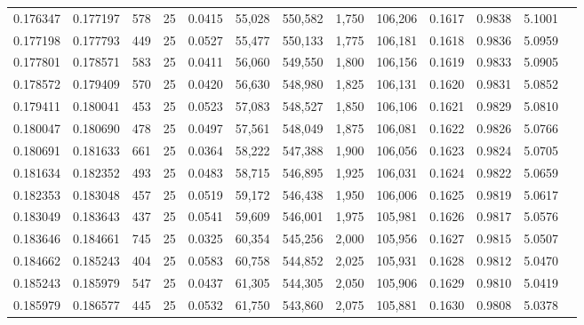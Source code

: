 \begin{tabular}{rrrrrrrrrrrrr}
0.176347 & 0.177197 &   578 &  25 &                                     0.0415 &  55,028 & 550,582 &   1,750 & 106,206 & 0.1617 & 0.9838 & 5.1001 \\
0.177198 & 0.177793 &   449 &  25 &                                     0.0527 &  55,477 & 550,133 &   1,775 & 106,181 & 0.1618 & 0.9836 & 5.0959 \\
0.177801 & 0.178571 &   583 &  25 &                                     0.0411 &  56,060 & 549,550 &   1,800 & 106,156 & 0.1619 & 0.9833 & 5.0905 \\
0.178572 & 0.179409 &   570 &  25 &                                     0.0420 &  56,630 & 548,980 &   1,825 & 106,131 & 0.1620 & 0.9831 & 5.0852 \\
0.179411 & 0.180041 &   453 &  25 &                                     0.0523 &  57,083 & 548,527 &   1,850 & 106,106 & 0.1621 & 0.9829 & 5.0810 \\
0.180047 & 0.180690 &   478 &  25 &                                     0.0497 &  57,561 & 548,049 &   1,875 & 106,081 & 0.1622 & 0.9826 & 5.0766 \\
0.180691 & 0.181633 &   661 &  25 &                                     0.0364 &  58,222 & 547,388 &   1,900 & 106,056 & 0.1623 & 0.9824 & 5.0705 \\
0.181634 & 0.182352 &   493 &  25 &                                     0.0483 &  58,715 & 546,895 &   1,925 & 106,031 & 0.1624 & 0.9822 & 5.0659 \\
0.182353 & 0.183048 &   457 &  25 &                                     0.0519 &  59,172 & 546,438 &   1,950 & 106,006 & 0.1625 & 0.9819 & 5.0617 \\
0.183049 & 0.183643 &   437 &  25 &                                     0.0541 &  59,609 & 546,001 &   1,975 & 105,981 & 0.1626 & 0.9817 & 5.0576 \\
0.183646 & 0.184661 &   745 &  25 &                                     0.0325 &  60,354 & 545,256 &   2,000 & 105,956 & 0.1627 & 0.9815 & 5.0507 \\
0.184662 & 0.185243 &   404 &  25 &                                     0.0583 &  60,758 & 544,852 &   2,025 & 105,931 & 0.1628 & 0.9812 & 5.0470 \\
0.185243 & 0.185979 &   547 &  25 &                                     0.0437 &  61,305 & 544,305 &   2,050 & 105,906 & 0.1629 & 0.9810 & 5.0419 \\
0.185979 & 0.186577 &   445 &  25 &                                     0.0532 &  61,750 & 543,860 &   2,075 & 105,881 & 0.1630 & 0.9808 & 5.0378 \\

\end{tabular}
